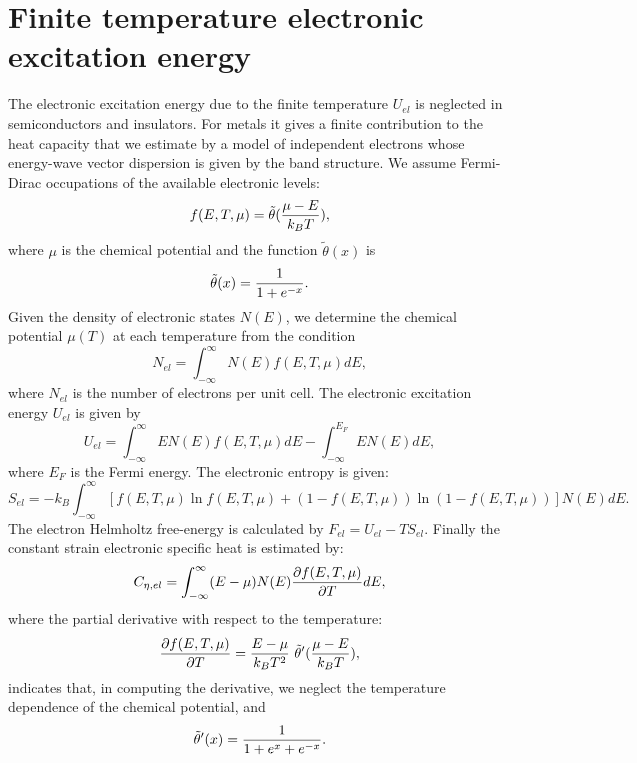 \documentclass[12pt,a4paper]{article}
\begin{document}
\section{\color{coral}Finite temperature electronic excitation energy}
The electronic excitation energy due to the finite temperature $U_{el}$ is
neglected in semiconductors and insulators. For metals it gives a finite
contribution to the heat capacity that we estimate by a model of independent 
electrons whose energy-wave vector dispersion is given by the band structure. 
We assume Fermi-Dirac occupations of the available electronic levels:
\begin{equation}
f(E,T,\mu) = \tilde \theta({\mu - E \over k_B T}),
\end{equation}
where $\mu$ is the chemical potential and the function $\tilde \theta(x)$ is
\begin{equation}
\tilde \theta(x) = {1 \over 1 + e^{-x}}.
\end{equation}
Given the density of electronic states $N(E)$,
we determine the chemical potential $\mu(T)$ at each temperature
from the condition
\begin{equation}
N_{el} = \int_{-\infty}^\infty N(E) f(E,T,\mu) dE,
\end{equation}
where $N_{el}$ is the number of electrons per unit cell.
The electronic excitation energy $U_{el}$ is given by
\begin{equation}
U_{el}=\int_{-\infty}^\infty E N(E) f(E,T,\mu) dE - 
\int_{-\infty}^{E_F} E N(E) dE,
\end{equation}
where $E_F$ is the Fermi energy.
The electronic entropy is given:
\begin{equation}
S_{el}=-k_B\int_{-\infty}^\infty \left[ f(E,T,\mu) \ln f(E,T,\mu) 
+ (1 - f(E,T,\mu)) \ln (1 - f(E,T,\mu)) \right] N(E) dE.
\end{equation}
The electron Helmholtz free-energy is calculated by 
$F_{el}=U_{el}-TS_{el}$.
Finally the constant strain electronic specific heat is estimated by:
\begin{equation}
C_{\eta,el}=\int_{-\infty}^\infty (E - \mu) N(E) 
{\partial f(E,T,\mu) \over \partial T} dE,  
\end{equation}
where the partial derivative with respect to the temperature:
\begin{equation}
{\partial f(E,T,\mu) \over \partial T} = {E -\mu \over k_B T^2} \ \tilde 
\theta'({\mu - E \over k_B T}),
\end{equation}
indicates that, in computing the derivative, we neglect the temperature 
dependence of the chemical potential, and
\begin{equation}
\tilde \theta'(x) = {1 \over 1 + e^x+ e^{-x}}.
\end{equation}
\end{document}
